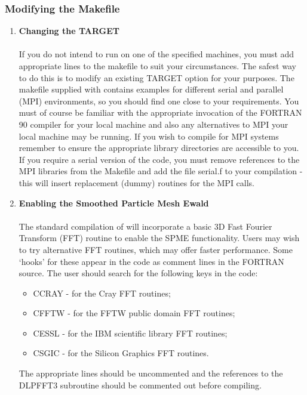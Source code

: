 \subsubsection{Modifying the Makefile}

\begin{enumerate}
\item {\bf Changing the TARGET}\\~\\
If you do not intend to run \D{} on one of the specified machines, you
must add appropriate lines to the makefile to suit your
circumstances. The safest way to do this is to modify an existing
TARGET option for your purposes. The makefile supplied with \D{}
contains examples for different serial and parallel (MPI) 
environments, so you should find one close to your
requirements.  You must of course be familiar with the appropriate
invocation of the FORTRAN 90 compiler for your local machine and also any
alternatives to MPI your local machine may be running.  If you wish to
compile for MPI systems remember to ensure the appropriate library
directories are accessible to you. If you require a serial version of
the code, you must remove references to the MPI libraries from the
Makefile and add the file serial.f to your compilation - this will
insert replacement (dummy) routines for the MPI calls.


\item {\bf Enabling the Smoothed Particle Mesh Ewald}\\~\\

The standard compilation of \D{} will incorporate a basic 3D Fast
Fourier Transform (FFT) routine to enable the SPME functionality.
Users may wish to try alternative FFT routines, which may offer faster
performance. Some `hooks' for these appear in the code as comment
lines in the FORTRAN source. The user should search for the
following keys in the code:

\begin{itemize}
\item CCRAY - for the Cray FFT routines;
\item CFFTW - for the FFTW public domain FFT routines;
\item CESSL - for the IBM scientific library FFT routines;
\item CSGIC - for the Silicon Graphics FFT routines.
\end{itemize}

The appropriate lines should be uncommented and the references to the
{\sc DLPFFT3} subroutine should be commented out before compiling.


\end{enumerate}
